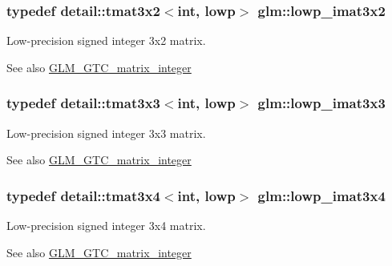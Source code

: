 \subsubsection[{\texorpdfstring{lowp\+\_\+imat3x2}{lowp_imat3x2}}]{\setlength{\rightskip}{0pt plus 5cm}typedef detail\+::tmat3x2$<$int, lowp$>$ {\bf glm\+::lowp\+\_\+imat3x2}}\hypertarget{group__gtc__matrix__integer_ga250780f2be05f698b881b04ba7ce0452}{}\label{group__gtc__matrix__integer_ga250780f2be05f698b881b04ba7ce0452}
Low-\/precision signed integer 3x2 matrix. \begin{DoxySeeAlso}{See also}
\hyperlink{group__gtc__matrix__integer}{G\+L\+M\+\_\+\+G\+T\+C\+\_\+matrix\+\_\+integer} 
\end{DoxySeeAlso}
\subsubsection[{\texorpdfstring{lowp\+\_\+imat3x3}{lowp_imat3x3}}]{\setlength{\rightskip}{0pt plus 5cm}typedef detail\+::tmat3x3$<$int, lowp$>$ {\bf glm\+::lowp\+\_\+imat3x3}}\hypertarget{group__gtc__matrix__integer_gae0d6068aaf9b1f8f06c6cc32941f9471}{}\label{group__gtc__matrix__integer_gae0d6068aaf9b1f8f06c6cc32941f9471}
Low-\/precision signed integer 3x3 matrix. \begin{DoxySeeAlso}{See also}
\hyperlink{group__gtc__matrix__integer}{G\+L\+M\+\_\+\+G\+T\+C\+\_\+matrix\+\_\+integer} 
\end{DoxySeeAlso}
\subsubsection[{\texorpdfstring{lowp\+\_\+imat3x4}{lowp_imat3x4}}]{\setlength{\rightskip}{0pt plus 5cm}typedef detail\+::tmat3x4$<$int, lowp$>$ {\bf glm\+::lowp\+\_\+imat3x4}}\hypertarget{group__gtc__matrix__integer_gaba7c2c9f782278aaa10dad882d73ef0d}{}\label{group__gtc__matrix__integer_gaba7c2c9f782278aaa10dad882d73ef0d}
Low-\/precision signed integer 3x4 matrix. \begin{DoxySeeAlso}{See also}
\hyperlink{group__gtc__matrix__integer}{G\+L\+M\+\_\+\+G\+T\+C\+\_\+matrix\+\_\+integer} 
\end{DoxySeeAlso}
